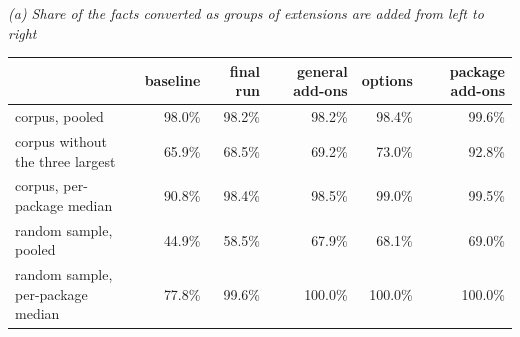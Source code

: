 \documentclass[11pt]{article}
\begin{document}
\begin{table}[tp]\centering\small
{\itshape (a) Share of the facts converted as groups of extensions are added from left to right}\par\smallskip
\setlength{\tabcolsep}{5pt}
\begin{tabular}{lrrrrr}\toprule
 & baseline & final run & general add-ons & options & package add-ons\\\midrule
corpus, pooled & 98.0\% & 98.2\% & 98.2\% & 98.4\% & 99.6\%\\
corpus without the three largest & 65.9\% & 68.5\% & 69.2\% & 73.0\% & 92.8\%\\
corpus, per-package median & 90.8\% & 98.4\% & 98.5\% & 99.0\% & 99.5\%\\
random sample, pooled & 44.9\% & 58.5\% & 67.9\% & 68.1\% & 69.0\%\\
random sample, per-package median & 77.8\% & 99.6\% & 100.0\% & 100.0\% & 100.0\%\\
\bottomrule
\end{tabular}


\end{table}
\end{document}
